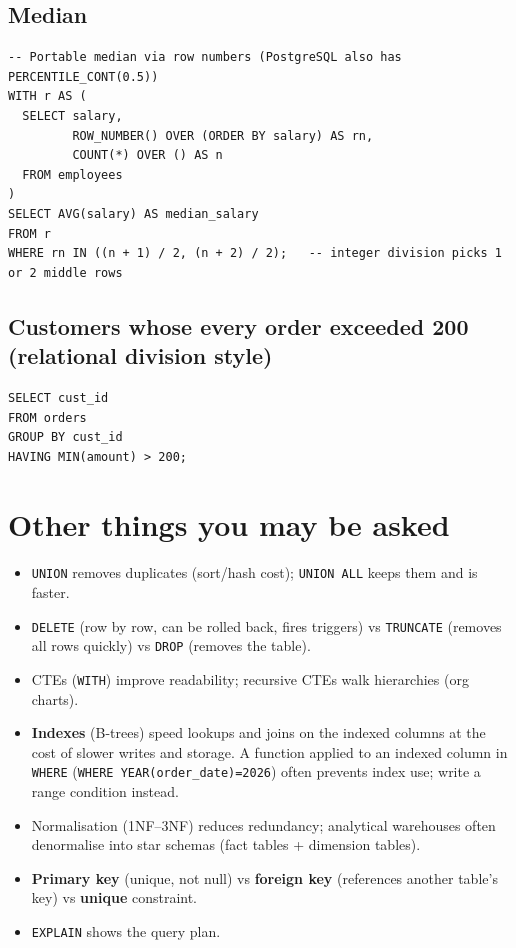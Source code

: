 \subsection{Median}
\begin{lstlisting}[style=sql]
-- Portable median via row numbers (PostgreSQL also has PERCENTILE_CONT(0.5))
WITH r AS (
  SELECT salary,
         ROW_NUMBER() OVER (ORDER BY salary) AS rn,
         COUNT(*) OVER () AS n
  FROM employees
)
SELECT AVG(salary) AS median_salary
FROM r
WHERE rn IN ((n + 1) / 2, (n + 2) / 2);   -- integer division picks 1 or 2 middle rows
\end{lstlisting}

\subsection{Customers whose every order exceeded 200 (relational division style)}
\begin{lstlisting}[style=sql]
SELECT cust_id
FROM orders
GROUP BY cust_id
HAVING MIN(amount) > 200;
\end{lstlisting}

\section{Other things you may be asked}
\begin{itemize}
  \item \texttt{UNION} removes duplicates (sort/hash cost); \texttt{UNION ALL} keeps them and is faster.
  \item \texttt{DELETE} (row by row, can be rolled back, fires triggers) vs \texttt{TRUNCATE} (removes all rows quickly) vs \texttt{DROP} (removes the table).
  \item CTEs (\texttt{WITH}) improve readability; recursive CTEs walk hierarchies (org charts).
  \item \textbf{Indexes} (B-trees) speed lookups and joins on the indexed columns at the cost of slower writes and storage. A function applied to an indexed column in \texttt{WHERE} (\texttt{WHERE YEAR(order\_date)=2026}) often prevents index use; write a range condition instead.
  \item Normalisation (1NF--3NF) reduces redundancy; analytical warehouses often denormalise into star schemas (fact tables + dimension tables).
  \item \textbf{Primary key} (unique, not null) vs \textbf{foreign key} (references another table's key) vs \textbf{unique} constraint.
  \item \texttt{EXPLAIN} shows the query plan.
\end{itemize}

